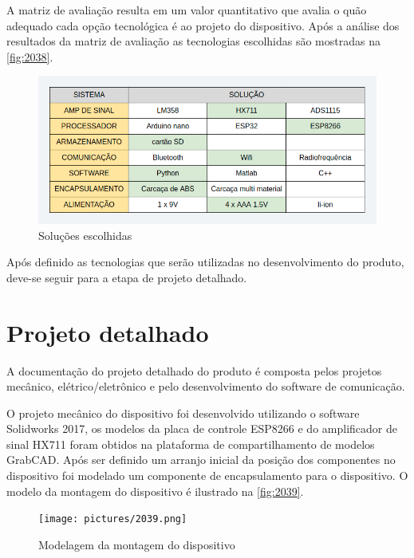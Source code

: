 A matriz de avaliação resulta em um valor quantitativo que avalia o quão adequado cada opção tecnológica é ao projeto do dispositivo.
Após a análise dos resultados da matriz de avaliação as tecnologias escolhidas são mostradas na \autoref{fig:2038}.

\begin{figure}[H]
	\caption{\label{fig:2038} Soluções escolhidas}
	\begin{center}
		\includegraphics[width=\textwidth]{pictures/2038.png}
	\end{center}
\end{figure}

Após definido as tecnologias que serão utilizadas no desenvolvimento do produto, deve-se seguir para a etapa de projeto detalhado.

\section{Projeto detalhado}

A documentação do projeto detalhado do produto é composta pelos projetos mecânico, elétrico/eletrônico e pelo desenvolvimento do software de comunicação.

O projeto mecânico do dispositivo foi desenvolvido utilizando o software Solidworks 2017, os modelos da placa de controle ESP8266 e do amplificador de sinal HX711
foram obtidos na plataforma de compartilhamento de modelos GrabCAD. Após ser definido um arranjo inicial da posição dos componentes no dispositivo foi modelado um
componente de encapsulamento para o dispositivo.
O modelo da montagem do dispositivo é ilustrado na \autoref{fig:2039}.

\begin{figure}[H]
	\caption{\label{fig:2039} Modelagem da montagem do dispositivo}
	\begin{center}
		\texttt{[image: pictures/2039.png]}
	\end{center}
\end{figure}

